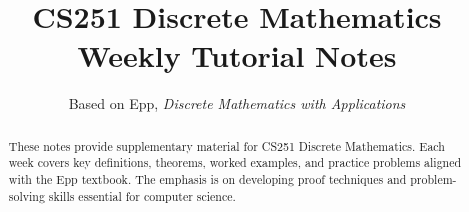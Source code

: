 \documentclass[11pt]{article}
\theoremstyle{definition}
\theoremstyle{plain}
\theoremstyle{remark}
\begin{document}
\title{CS251 Discrete Mathematics\\[0.5em]\large Weekly Tutorial Notes}
\author{Based on Epp, \textit{Discrete Mathematics with Applications}}
\date{}
\maketitle

\begin{abstract}
These notes provide supplementary material for CS251 Discrete Mathematics. Each week covers key definitions, theorems, worked examples, and practice problems aligned with the Epp textbook. The emphasis is on developing proof techniques and problem-solving skills essential for computer science.
\end{abstract}

\tableofcontents
\newpage


\newpage

\newpage

\newpage

\newpage

\newpage

\newpage

\newpage

\newpage

\newpage

\newpage

\end{document}
